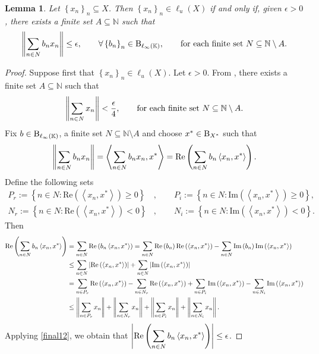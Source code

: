 \documentclass[14pt, a4paper]{article}  %
\providecommand{\llave}[1]{\left\lbrace #1\right\rbrace }
\providecommand{\pare}[1]{\left( #1\right) }
\providecommand{\norm}[1]{\left\lVert#1\right\rVert}
\providecommand{\re}[1]{\text{Re}\pare{#1}}
\providecommand{\im}[1]{\text{Im}\pare{#1}}
\providecommand{\abs}[1]{\left\lvert#1\right\rvert}
\providecommand{\Sum}[1]{\displaystyle\sum#1}
\newcommand{\K}{\mathbb{K}}
\newcommand{\N}{\mathbb{N}}
\newcommand{\B}{\textup{B}}
\newcommand{\la}{\left\langle}
\newcommand{\ra}{\right\rangle}
\newtheorem{lemma}{Lemma}[section]
\begin{document}
\begin{lemma}\label{final14_0}
Let $\llave{x_{n}}_{n}\subseteq X$. Then $\llave{x_{n}}_{n}\in \ell_{u}\pare{X}$ if and only if, given $\epsilon>0$, there exists a finite set  $A\subseteq \N$ such that
	\begin{equation}\label{final13}
		\norm{\Sum_{n\in N}b_{n}x_{n}}\leq \epsilon,\qquad \forall \llave{b_{n}}_{n}\in \B_{\ell_{\infty}\pare{\K}},\qquad  \text{for each finite set } N\subseteq \N\setminus A.
	\end{equation}
\end{lemma}
 \begin{proof} Suppose first that $\llave{x_{n}}_{n}\in \ell_{u}\pare{X}$.	Let $\epsilon>0$. From \cite[p. 959]{Hi}, there exists a finite set $A\subseteq \N$ such that
 	\begin{equation}\label{final12}
 		\norm{\Sum_{n\in N}x_{n}}<\frac{\epsilon}{4},\qquad \text{for each finite set } N\subseteq \N\setminus A.
 	\end{equation}
 	Fix $b\in \B_{\ell_{\infty}\pare{\K}}$, a finite set $N\subseteq \N\setminus A$ and choose $x^{*}\in \B_{X^{*}}$ such that
 	\begin{equation}
 		\norm{\Sum_{n\in N} b_{n}x_{n}}=\la \Sum_{n\in N} b_{n}x_{n}, x^{*}\ra =\re{\Sum_{n\in N} b_{n}\la x_{n},x^{*}\ra}.
 	\end{equation}
 	Define the following sets
 	\begin{align*}
 		P_{r}:=\llave{n\in N:\re{\la x_{n},x^{*}\ra}\geq 0}&,\qquad P_{i}:=\llave{n\in N:\im{\la x_{n},x^{*}\ra}\geq 0},\\
 		N_{r}:=\llave{n\in N:\re{\la x_{n},x^{*}\ra}< 0}&,\qquad N_{i}:=\llave{n\in N:\im{\la x_{n},x^{*}\ra}< 0}.
 	\end{align*}  Then
 	\begin{align*}
 		\re{\Sum_{n\in N} b_{n}\la x_{n},x^{*}\ra}&=\Sum_{n\in N} \re{b_{n}\la x_{n},x^{*}\ra}=\Sum_{n\in N}\re{b_{n}}\re{\la x_{n},x^{*}\ra}-\Sum_{n\in N}\im{b_{n}}\im{\la x_{n},x^{*}\ra}\\
 		&\leq \Sum_{n\in N} \abs{\re{\la x_{n},x^{*}\ra}}+\Sum_{n\in N} \abs{\im{\la x_{n},x^{*}\ra}}\\
 		&= \Sum_{n\in P_{r}}\re{\la x_{n},x^{*}\ra} - \Sum_{n\in N_{r}}\re{\la x_{n},x^{*}\ra} + \Sum_{n\in P_{i}}\im{\la x_{n},x^{*}\ra} - \Sum_{n\in N_{i}}\im{\la x_{n},x^{*}\ra}\\
 		&\leq \norm{\Sum_{n\in P_{r}}x_{n}} + \norm{\Sum_{n\in N_{r}}x_{n}}+\norm{\Sum_{n\in P_{i}}x_{n}} + \norm{\Sum_{n\in N_{i}}x_{n}}.
 	\end{align*}
 	Applying \eqref{final12}, we obtain  that $\abs{\re{\Sum_{n\in N} b_{n}\la x_{n},x^{*}\ra}}\leq \epsilon$.  
 	

\end{proof}
\end{document}
